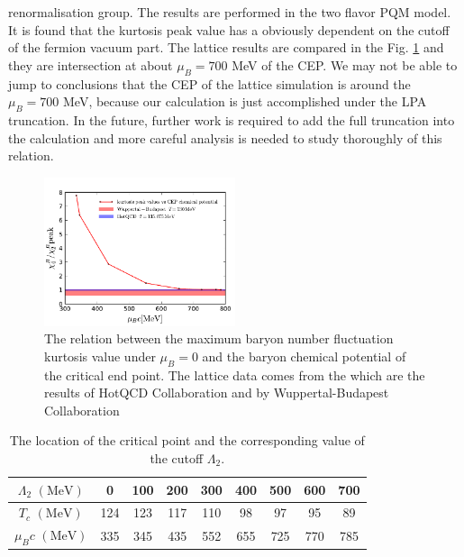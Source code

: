 \documentclass[%
reprint,
superscriptaddress,
showpacs,preprintnumbers,
 amsmath,amssymb,
 aps,
prl,
]{revtex4-1}
\begin{document}
renormalisation group. The results are performed in the two flavor PQM model. It is found that the kurtosis peak value has a obviously dependent on the cutoff of the fermion vacuum part. The lattice results are compared in the Fig. \ref{fig:cp} and they are intersection at about $\mu_B=700$ MeV of the CEP. We may not be able to jump to conclusions that the CEP of the lattice simulation is around the $\mu_B=700$ MeV, because our calculation is just accomplished under the LPA truncation. In the future, further work is required to add the full truncation into the calculation and more careful analysis is needed to study thoroughly of this relation.
%
\begin{figure}[t]
\includegraphics[width=0.5\textwidth]{cp}
\caption{The relation between the maximum baryon number fluctuation kurtosis value under $\mu_B=0$ and the baryon chemical potential of the critical end point. The lattice data comes from the \cite{Bazavov:2017dus,Bazavov:2017tot} which are the results of HotQCD Collaboration and \cite{Borsanyi:2013hza} by Wuppertal-Budapest Collaboration}\label{fig:cp}
\end{figure}
%
%
\begin{table}[t]
  \centering
  \begin{tabular}{c||c|c|c|c|c|c|c|c}
    \hline
    $\Lambda_2\,\,(\mathrm{MeV})$ & 0 & 100 & 200 & 300 & 400 & 500 & 600 & 700  \rule{0pt}{2.6ex}
\rule[-1.2ex]{0pt}{0pt}\\ \hline\hline
    $T_c\,\,(\mathrm{MeV})$ &124& 123 & 117 &110 &98&97&95&89 \\\hline
    $\mu_Bc\,\,(\mathrm{MeV})$ &335 &345 &435 &552&655&725&770&785\\\hline

  \end{tabular}
  \caption{The location of the critical point and the corresponding value of the cutoff $\Lambda_2$.} 
  \label{tab:cut}
\end{table}
\end{document}
